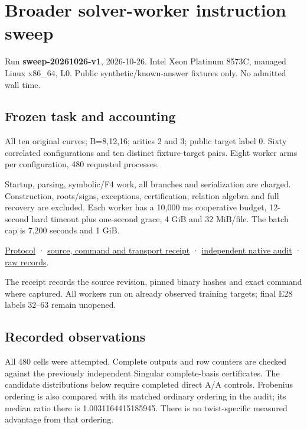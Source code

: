 \documentclass[
  10pt,
]{article}
\author{}
\date{}
\begin{document}
\section{Broader solver-worker instruction
sweep}\label{broader-solver-worker-instruction-sweep}

Run \textbf{sweep-20261026-v1}, 2026-10-26. Intel Xeon Platinum 8573C,
managed Linux x86\_64, L0. Public synthetic/known-answer fixtures only.
No admitted wall time.

\subsection{Frozen task and
accounting}\label{frozen-task-and-accounting}

All ten original curves; B=8,12,16; arities 2 and 3; public target label
0. Sixty correlated configurations and ten distinct fixture-target
pairs. Eight worker arms per configuration, 480 requested processes.

Startup, parsing, symbolic/F4 work, all branches and serialization are
charged. Construction, roots/signs, exceptions, certification, relation
algebra and full recovery are excluded. Each worker has a 10,000 ms
cooperative budget, 12-second hard timeout plus one-second grace, 4 GiB
and 32 MiB/file. The batch cap is 7,200 seconds and 1 GiB.

\href{../../../execution-v3/SWEEP_PROTOCOL_V1.md}{Protocol} ·
\href{../../../execution-v3/runs/sweep-20261026-v1.transport.json}{source,
command and transport receipt} ·
\href{../../../execution-v3/sweep-audit-20261026-v1/AUDIT.json}{independent
native audit} ·
\href{../../../execution-v3/runs/sweep-20261026-v1/RECORDS.json}{raw
records}.

The receipt records the source revision, pinned binary hashes and exact
command where captured. All workers run on already observed training
targets; final E28 labels 32--63 remain unopened.

\subsection{Recorded observations}\label{recorded-observations}

All 480 cells were attempted. Complete outputs and row counters are
checked against the previously independent Singular complete-basis
certificates. The candidate distributions below require completed direct
A/A controls. Frobenius ordering is also compared with its matched
ordinary ordering in the audit; its median ratio there is
1.0031164415185945. There is no twist-specific measured advantage from
that ordering.
\end{document}
